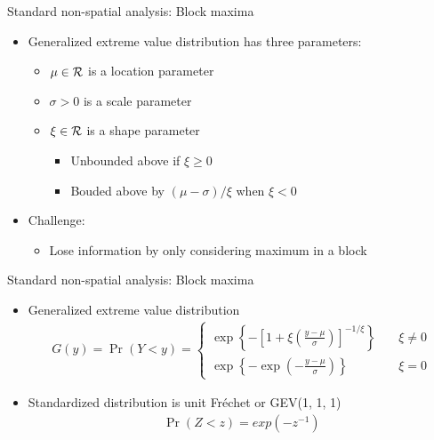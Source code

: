 \documentclass{beamer}
\begin{document}
\begin{frame}{Standard non-spatial analysis: Block maxima}
  \begin{itemize} \setlength{\itemsep}{0.5em}
    \item Generalized extreme value distribution has three parameters:
    \begin{itemize}
      \item $\mu \in {\cal R}$ is a location parameter
      \item $\sigma > 0$ is a scale parameter
      \item $\xi \in {\cal R}$ is a shape parameter
      \begin{itemize}
        \item Unbounded above if $\xi \ge 0$
        \item Bouded above by $(\mu - \sigma) / \xi$ when $\xi < 0$
      \end{itemize}
    \end{itemize}
    \item Challenge:
    \begin{itemize}
      \item Lose information by only considering maximum in a block
    \end{itemize}
  \end{itemize}
\end{frame}

\begin{frame}{Standard non-spatial analysis: Block maxima}
  \begin{itemize} \setlength{\itemsep}{0.5em}
    \item Generalized extreme value distribution
    \begin{align*}
      G(y) = \Pr(Y < y) = \left\{  \begin{array}{ll}
        \exp\left\{ -\left[ 1 + \xi \left( \frac{ y - \mu }{ \sigma } \right) \right]^{ -1 / \xi} \right\} & \quad \xi \neq 0 \\[0.5em]
        \exp \left\{ -\exp \left( - \frac{ y - \mu }{ \sigma} \right) \right\} & \quad \xi = 0
      \end{array}\right.
    \end{align*}
    \item Standardized distribution is unit Fr\'{e}chet or GEV(1, 1, 1)
    \begin{align*}
      \Pr(Z < z) = exp(-z^{-1})
    \end{align*}
  \end{itemize}
\end{frame}
\end{document}
